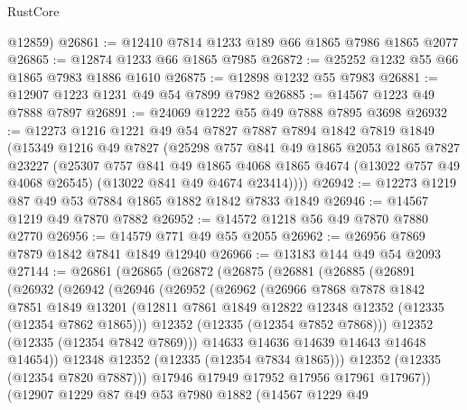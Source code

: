 \begin{lexlean}{RustCore}
\begin{coremodule}
      @12859)
@26861 := @12410 @7814 @1233 @189 @66 @1865 @7986 @1865 @2077
@26865 := @12874 @1233 @66 @1865 @7985
@26872 := @25252 @1232 @55 @66 @1865 @7983 @1886 @1610
@26875 := @12898 @1232 @55 @7983
@26881 := @12907 @1223 @1231 @49 @54 @7899 @7982
@26885 := @14567 @1223 @49 @7888 @7897
@26891 := @24069 @1222 @55 @49 @7888 @7895 @3698
@26932 := @12273
    @1216
    @1221
    @49
    @54
    @7827
    @7887
    @7894
    @1842
    @7819
    @1849
    (@15349
      @1216
      @49
      @7827
      (@25298
        @757
        @841
        @49
        @1865
        @2053
        @1865
        @7827
        @23227
        (@25307
          @757
          @841
          @49
          @1865
          @4068
          @1865
          @4674
          (@13022 @757 @49 @4068 @26545)
          (@13022 @841 @49 @4674 @23414))))
@26942 := @12273 @1219 @87 @49 @53 @7884 @1865 @1882 @1842 @7833 @1849
@26946 := @14567 @1219 @49 @7870 @7882
@26952 := @14572 @1218 @56 @49 @7870 @7880 @2770
@26956 := @14579 @771 @49 @55 @2055
@26962 := @26956 @7869 @7879 @1842 @7841 @1849 @12940
@26966 := @13183 @144 @49 @54 @2093
@27144 := @26861
    (@26865
      (@26872
        (@26875
          (@26881
            (@26885
              (@26891
                (@26932
                  (@26942
                    (@26946
                      (@26952
                        (@26962
                          (@26966
                            @7868
                            @7878
                            @1842
                            @7851
                            @1849
                            @13201
                            (@12811 @7861 @1849 @12822 @12348 @12352 (@12335 (@12354 @7862 @1865)))
                            @12352
                            (@12335 (@12354 @7852 @7868)))
                          @12352
                          (@12335 (@12354 @7842 @7869)))
                        @14633
                        @14636
                        @14639
                        @14643
                        @14648
                        @14654))
                    @12348
                    @12352
                    (@12335 (@12354 @7834 @1865)))
                  @12352
                  (@12335 (@12354 @7820 @7887)))
                @17946
                @17949
                @17952
                @17956
                @17961
                @17967))
            (@12907
              @1229
              @87
              @49
              @53
              @7980
              @1882
              (@14567
                @1229
                @49

\end{coremodule}
\end{lexlean}
